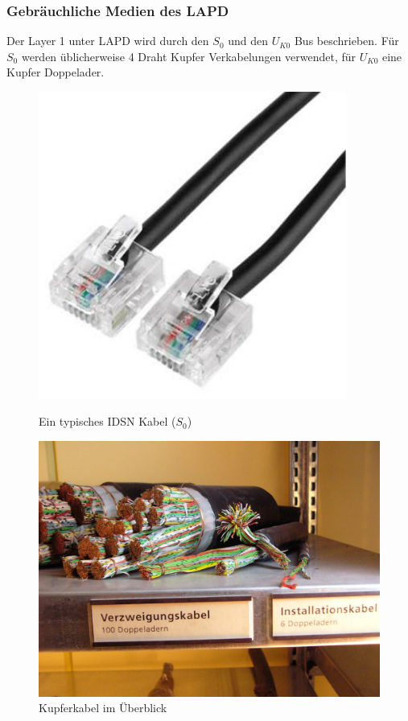 \documentclass[12pt, a4paper, ngerman]{article}
\begin{document}
\subsubsection{Gebräuchliche Medien des LAPD}
Der Layer 1 unter LAPD wird durch den $S_0$ und den $U_{K0}$ Bus beschrieben. Für  $S_0$ werden üblicherweise 4 Draht Kupfer Verkabelungen verwendet, für $U_{K0}$ eine Kupfer Doppelader.
\begin{figure}[H]
\begin{minipage}[hbt]{.35\linewidth}
	\centering
	\includegraphics[width=0.9\textwidth]{Grafiken/isdn_kabel.jpg}	
	\caption{Ein typisches IDSN Kabel  ($S_0$) \cite{isdn_kabel}}
	\label{isdn_kabel}\end{minipage}
\hfill
\begin{minipage}[hbt]{.65\linewidth}
	\centering
	\includegraphics[width=0.9\linewidth]{Grafiken/kuperkabel.jpg}
	\caption{Kupferkabel im Überblick \cite{cu_doppelader}}
	\label{cu_kabel}
\end{minipage}
\end{figure}
\end{document}
